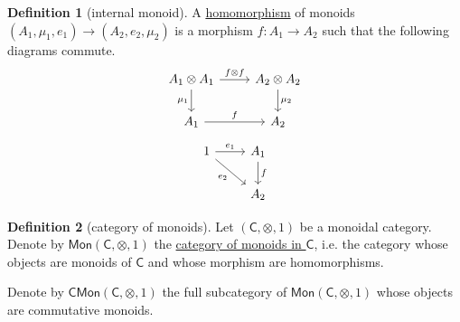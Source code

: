 \documentclass[a4paper]{report}
\newcommand{\defn}[1]{\ul{#1}}
\theoremstyle{definition}
\newtheorem{definition}{Definition}[section]
\theoremstyle{plain}
\theoremstyle{remark}
\begin{document}
\begin{definition}[internal monoid]
  A \defn{homomorphism} of monoids $(A_{1}, \mu_{1}, e_{1}) \to (A_{2}, e_{2}, \mu_{2})$ is a morphism $f\colon A_{1} \to A_{2}$ such that the following diagrams commute.
  \begin{equation*}
    \begin{tikzcd}
      A_{1} \otimes A_{1}
      \arrow[r, "f \otimes f"]
      \arrow[d, swap, "\mu_{1}"]
      & A_{2} \otimes A_{2}
      \arrow[d, "\mu_{2}"]
      \\
      A_{1} 
      \arrow[r, "f"]
      & A_{2}
    \end{tikzcd}
  \end{equation*}
  \begin{equation*}
    \begin{tikzcd}
      1
      \arrow[r, "e_{1}"]
      \arrow[rd, swap, "e_{2}"]
      & A_{1}
      \arrow[d, "f"]
      \\
      & A_{2}
    \end{tikzcd}
  \end{equation*}
\end{definition}

\begin{definition}[category of monoids]
  \label{def:categoryofmonoids}
  Let $(\mathsf{C}, \otimes, 1)$ be a monoidal category. Denote by $\mathsf{Mon}(\mathsf{C}, \otimes, 1)$ the \defn{category of monoids in $\mathsf{C}$}, i.e. the category whose objects are monoids of $\mathsf{C}$ and whose morphism are homomorphisms.

  Denote by $\mathsf{CMon}(\mathsf{C}, \otimes, 1)$ the full subcategory of $\mathsf{Mon}(\mathsf{C}, \otimes, 1)$ whose objects are commutative monoids.
\end{definition}
\end{document}
